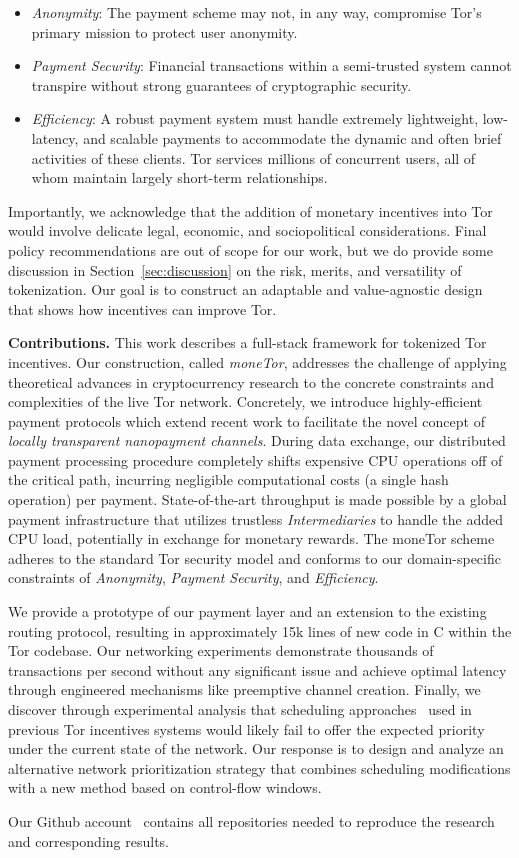 \begin{itemize}
\item \emph{Anonymity}: The payment scheme may not, in any way, compromise Tor's primary mission to protect user anonymity.
\item \emph{Payment Security}: Financial transactions within a semi-trusted system cannot transpire without strong guarantees of cryptographic security.
\item \emph{Efficiency}: A robust payment system must handle extremely lightweight, low-latency, and scalable payments to accommodate the dynamic and often brief activities of these clients.
  Tor services millions of concurrent users, all of whom maintain largely short-term relationships.
\end{itemize}

Importantly, we acknowledge that the addition of monetary incentives into Tor would involve delicate legal, economic, and sociopolitical considerations.
Final policy recommendations are out of scope for our work, but we do provide some discussion in Section~\ref{sec:discussion} on the risk, merits, and versatility of tokenization.
Our goal is to construct an adaptable and value-agnostic design that shows how incentives can improve Tor.

\label{sec:Contributions} \medskip \noindent \textbf{Contributions.}
This work describes a full-stack framework for tokenized Tor incentives.
Our construction, called \emph{moneTor}, addresses the challenge of applying theoretical advances in cryptocurrency research to the concrete constraints and complexities of the live Tor network.
Concretely, we introduce highly-efficient payment protocols which extend recent work to facilitate the novel concept of \emph{locally transparent nanopayment channels}.
During data exchange, our distributed payment processing procedure completely shifts expensive CPU operations off of the critical path, incurring negligible computational costs (a single hash operation) per payment.
State-of-the-art throughput is made possible by a global payment infrastructure that utilizes trustless \emph{Intermediaries} to handle the added CPU load, potentially in exchange for monetary rewards.
The moneTor scheme adheres to the standard Tor security model and conforms to our domain-specific constraints of \emph{Anonymity}, \emph{Payment Security}, and \emph{Efficiency}.

We provide a prototype of our payment layer and an extension to the existing routing protocol, resulting in approximately 15k lines of new code in C within the Tor codebase.
Our networking experiments demonstrate thousands of transactions per second without any significant issue and achieve optimal latency through engineered mechanisms like preemptive channel creation.
Finally, we discover through experimental analysis that scheduling approaches~\cite{dovrolis1999case, tang2010improved} used in previous Tor incentives systems would likely fail to offer the expected priority under the current state of the network.
Our response is to design and analyze an alternative network prioritization strategy that combines scheduling modifications with a new method based on control-flow windows.

Our Github account~\cite{monetor-github} contains all repositories needed to reproduce the research and corresponding results.

